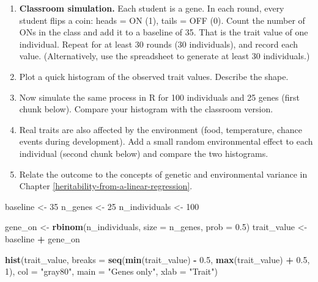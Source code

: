 \documentclass[
  a4paper]{book}
\newenvironment{Shaded}{\begin{snugshade}}{\end{snugshade}}
\newcommand{\AttributeTok}[1]{\textcolor[rgb]{0.13,0.29,0.53}{#1}}
\newcommand{\DecValTok}[1]{\textcolor[rgb]{0.00,0.00,0.81}{#1}}
\newcommand{\FloatTok}[1]{\textcolor[rgb]{0.00,0.00,0.81}{#1}}
\newcommand{\FunctionTok}[1]{\textcolor[rgb]{0.13,0.29,0.53}{\textbf{#1}}}
\newcommand{\NormalTok}[1]{#1}
\newcommand{\OtherTok}[1]{\textcolor[rgb]{0.56,0.35,0.01}{#1}}
\newcommand{\SpecialCharTok}[1]{\textcolor[rgb]{0.81,0.36,0.00}{\textbf{#1}}}
\newcommand{\StringTok}[1]{\textcolor[rgb]{0.31,0.60,0.02}{#1}}
\providecommand{\tightlist}{%
  \setlength{\itemsep}{0pt}\setlength{\parskip}{0pt}}
\begin{document}
\begin{enumerate}
\def\labelenumi{\arabic{enumi}.}
\tightlist
\item
  \textbf{Classroom simulation.} Each student is a gene. In each round, every student flips a coin: heads = ON (1), tails = OFF (0). Count the number of ONs in the class and add it to a baseline of 35. That is the trait value of one individual. Repeat for at least 30 rounds (30 individuals), and record each value. (Alternatively, use the spreadsheet to generate at least 30 individuals.)
\item
  Plot a quick histogram of the observed trait values. Describe the shape.
\item
  Now simulate the same process in R for 100 individuals and 25 genes (first chunk below). Compare your histogram with the classroom version.
\item
  Real traits are also affected by the environment (food, temperature, chance events during development). Add a small random environmental effect to each individual (second chunk below) and compare the two histograms.
\item
  Relate the outcome to the concepts of genetic and environmental variance in Chapter \ref{heritability-from-a-linear-regression}.
\end{enumerate}

\begin{Shaded}
\begin{Highlighting}[]
\NormalTok{baseline }\OtherTok{\textless{}{-}} \DecValTok{35}
\NormalTok{n\_genes }\OtherTok{\textless{}{-}} \DecValTok{25}
\NormalTok{n\_individuals }\OtherTok{\textless{}{-}} \DecValTok{100}

\NormalTok{gene\_on }\OtherTok{\textless{}{-}} \FunctionTok{rbinom}\NormalTok{(n\_individuals, }\AttributeTok{size =}\NormalTok{ n\_genes, }\AttributeTok{prob =} \FloatTok{0.5}\NormalTok{)}
\NormalTok{trait\_value }\OtherTok{\textless{}{-}}\NormalTok{ baseline }\SpecialCharTok{+}\NormalTok{ gene\_on}

\FunctionTok{hist}\NormalTok{(trait\_value, }\AttributeTok{breaks =} \FunctionTok{seq}\NormalTok{(}\FunctionTok{min}\NormalTok{(trait\_value) }\SpecialCharTok{{-}} \FloatTok{0.5}\NormalTok{, }\FunctionTok{max}\NormalTok{(trait\_value) }\SpecialCharTok{+} \FloatTok{0.5}\NormalTok{, }\DecValTok{1}\NormalTok{),}
     \AttributeTok{col =} \StringTok{"gray80"}\NormalTok{, }\AttributeTok{main =} \StringTok{"Genes only"}\NormalTok{, }\AttributeTok{xlab =} \StringTok{"Trait"}\NormalTok{)}
\end{Highlighting}
\end{Shaded}
\end{document}
